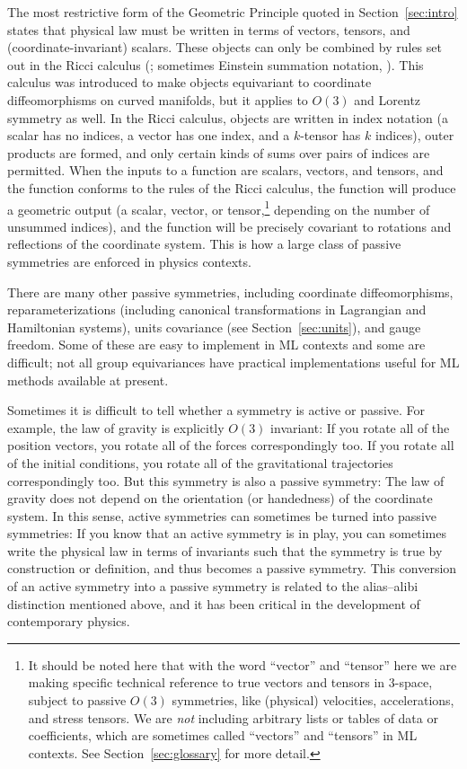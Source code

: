 \documentclass[preprint]{article} %
\newcommand{\sectionname}{Section}
\newcommand{\secref}[1]{\sectionname~\ref{#1}}
\begin{document}
The most restrictive form of the Geometric Principle quoted in \secref{sec:intro} states that physical law must be written in terms of vectors, tensors, and (coordinate-invariant) scalars.
These objects can only be combined by rules set out in the Ricci calculus (\citealt{ricci}; sometimes Einstein summation notation, \citealt{einstein}).
This calculus was introduced to make objects equivariant to coordinate diffeomorphisms on curved manifolds, but it applies to $O(3)$ and Lorentz symmetry as well.
In the Ricci calculus, objects are written in index notation (a scalar has no indices, a vector has one index, and a $k$-tensor has $k$ indices), outer products are formed, and only certain kinds of sums over pairs of indices are permitted.
When the inputs to a function are scalars, vectors, and tensors, and the function conforms to the rules of the Ricci calculus, the function will produce a geometric output (a scalar, vector, or tensor,\footnote{%
It should be noted here that with the word ``vector'' and ``tensor'' here we are making specific technical reference to true vectors and tensors in 3-space, subject to passive $O(3)$ symmetries, like (physical) velocities, accelerations, and stress tensors.
We are \emph{not} including arbitrary lists or tables of data or coefficients, which are sometimes called ``vectors'' and ``tensors'' in ML contexts. See \secref{sec:glossary} for more detail.} depending on the number of unsummed indices), and the function will be precisely covariant to rotations and reflections of the coordinate system.
This is how a large class of passive symmetries are enforced in physics contexts.

There are many other passive symmetries, including coordinate diffeomorphisms, reparameterizations (including canonical transformations in Lagrangian and Hamiltonian systems), units covariance (see \secref{sec:units}), and gauge freedom.
Some of these are easy to implement in ML contexts and some are difficult;
not all group equivariances have practical implementations useful for ML methods available at present.

Sometimes it is difficult to tell whether a symmetry is active or passive.
For example, the law of gravity is explicitly $O(3)$ invariant:
If you rotate all of the position vectors, you rotate all of the forces correspondingly too.
If you rotate all of the initial conditions, you rotate all of the gravitational trajectories correspondingly too.
But this symmetry is also a passive symmetry:
The law of gravity does not depend on the orientation (or handedness) of the coordinate system.
In this sense, active symmetries can sometimes be turned into passive symmetries:
If you know that an active symmetry is in play, you can sometimes write the physical law in terms of invariants such that the symmetry is true by construction or definition, and thus becomes a passive symmetry.
This conversion of an active symmetry into a passive symmetry is related to the alias--alibi distinction mentioned above, and it has been critical in the development of contemporary physics.
\end{document}
